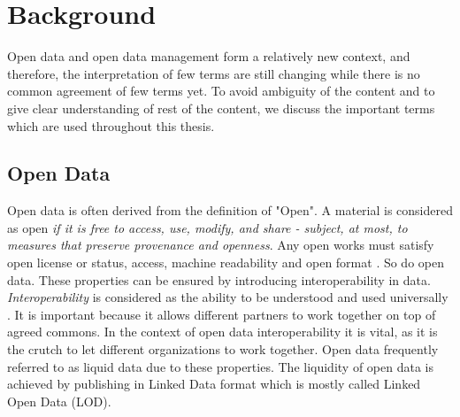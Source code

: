 \section{Background}
\noindent Open data and open data management form a relatively new context, and therefore, the interpretation of few terms are still changing while there is no common agreement of few terms yet.  To avoid ambiguity of the content and to give clear understanding of rest of the content, we discuss the important terms which are used throughout this thesis. 
\subsection{Open Data}
\noindent Open data is often derived from the definition of "Open". A material is considered as open \textit{if it is free to access, use, modify, and share - subject, at most, to measures that preserve provenance and openness}. Any open works must satisfy open license or status, access, machine readability and open format \cite{opendefinition}. So do open data. These properties can be ensured by introducing  interoperability in data. \textit{Interoperability} is considered as the ability to be understood and used universally \cite{opendatahandbook}. It is important because it allows different partners to work together on top of agreed commons. In the context of open data interoperability it is vital, as it is the crutch to let different organizations to work together. Open data frequently referred to as liquid data due to these properties. The liquidity of open data is achieved by publishing in Linked Data format which is mostly called Linked Open Data (LOD). 

